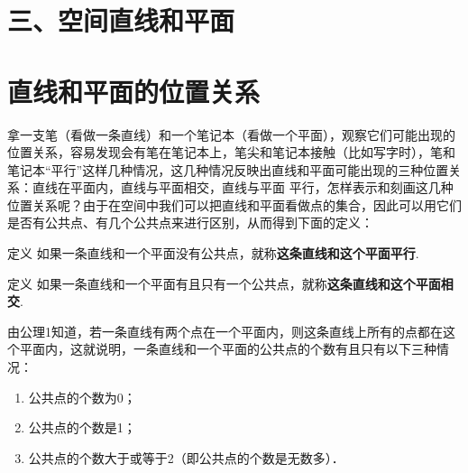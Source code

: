 \begin{enumerate}
\noindent
\begin{minipage}{.45\textwidth}
\centering
{}
\end{minipage}
\hfill
\begin{minipage}{.45\textwidth}
\centering
{}
\end{minipage}
\end{enumerate}

\section*{三、空间直线和平面}
\section{直线和平面的位置关系}
拿一支笔（看做一条直线）和一个笔记本（看做一个平面），观察它们可能出现的位置关系，容易发现会有笔在笔记本上，笔尖和笔记本接触（比如写字时），笔和笔记本“平行”这样几种情况，这几种情况反映出直线和平面可能出现的三种位置关系：直线在平面内，直线与平面相交，直线与平面
平行，怎样表示和刻画这几种位置关系呢？由于在空间中我们可以把直线和平面看做点的集合，因此可以用它们是否有公共点、有几个公共点来进行区别，从而得到下面的定义：

\begin{thm}
    {定义} 如果一条直线和一个平面没有公共点，就称\textbf{这条直线和这个平面平行}.
\end{thm}

\begin{thm}
    {定义} 如果一条直线和一个平面有且只有一个公共点，就称\textbf{这条直线和这个平面相交}.
\end{thm}

由公理1知道，若一条直线有两个点在一个平面内，则这条直线上所有的点都在这个平面内，这就说明，一条直线和一个平面的公共点的个数有且只有以下三种情况：
\begin{enumerate}[(1)]
    \item 公共点的个数为0；
    \item 公共点的个数是1；
    \item 公共点的个数大于或等于2（即公共点的个数是无数多）．
\end{enumerate}

